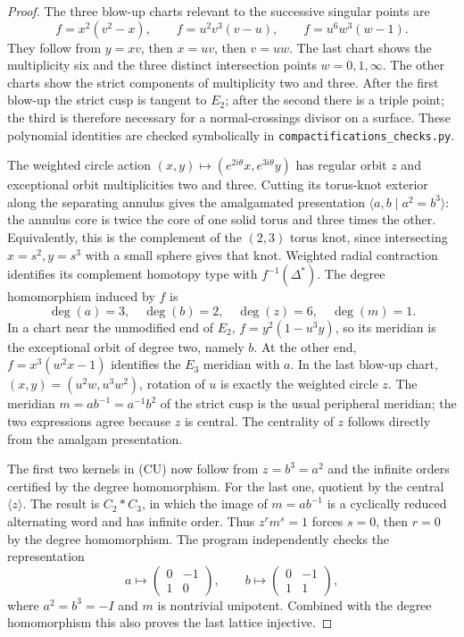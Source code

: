 \begin{proof}
The three blow-up charts relevant to the successive singular points are
\[
 f=x^2(v^2-x),\qquad
 f=u^2v^3(v-u),\qquad
 f=u^6w^3(w-1).
\]
They follow from $y=xv$, then $x=uv$, then $v=uw$.  The last chart shows the
multiplicity six and the three distinct intersection points $w=0,1,\infty$.
The other charts show the strict components of multiplicity two and three.
After the first blow-up the strict cusp is tangent to $E_2$; after the second
there is a triple point; the third is therefore necessary for a normal-crossings
divisor on a surface.  These polynomial identities are checked symbolically
in \texttt{compactifications\_checks.py}.

The weighted circle action $(x,y)\mapsto(e^{2i\theta}x,e^{3i\theta}y)$ has
regular orbit $z$ and exceptional orbit multiplicities two and three.
Cutting its torus-knot exterior along the separating annulus gives the
amalgamated presentation $\langle a,b\mid a^2=b^3\rangle$: the annulus core
is twice the core of one solid torus and three times the other.  Equivalently,
this is the complement of the $(2,3)$ torus knot, since intersecting
$x=s^2,y=s^3$ with a small sphere gives that knot.  Weighted radial contraction
identifies its complement homotopy type with $f^{-1}(\Delta^*)$.
The degree homomorphism induced by $f$ is
\[
 \deg(a)=3,\quad\deg(b)=2,\quad\deg(z)=6,\quad\deg(m)=1.
\]
In a chart near the unmodified end of $E_2$, $f=y^2(1-u^3y)$, so its meridian
is the exceptional orbit of degree two, namely $b$.  At the other end,
$f=x^3(w^2x-1)$ identifies the $E_3$ meridian with $a$.  In the last blow-up
chart, $(x,y)=(u^2w,u^3w^2)$, rotation of $u$ is exactly the weighted circle
$z$.  The meridian $m=ab^{-1}=a^{-1}b^2$ of the strict cusp is the usual
peripheral meridian; the two expressions agree because $z$ is central.
The centrality of $z$ follows directly from the amalgam presentation.

The first two kernels in (CU) now follow from $z=b^3=a^2$ and the infinite
orders certified by the degree homomorphism.  For the last one, quotient by
the central $\langle z\rangle$.  The result is $C_2*C_3$, in which the image
of $m=ab^{-1}$ is a cyclically reduced alternating word and has infinite
order.  Thus $z^rm^s=1$ forces $s=0$, then $r=0$ by the degree homomorphism.
The program independently checks the representation
\[
 a\longmapsto\begin{pmatrix}0&-1\\1&0\end{pmatrix},\qquad
 b\longmapsto\begin{pmatrix}0&-1\\1&1\end{pmatrix},
\]
where $a^2=b^3=-I$ and $m$ is nontrivial unipotent.  Combined with the degree
homomorphism this also proves the last lattice injective.


\end{proof}
